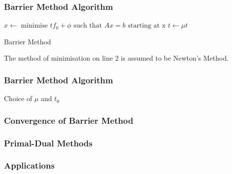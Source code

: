 \documentclass{beamer}
\begin{document}
\begin{frame}
    \frametitle{Barrier Method Algorithm}
    \begin{algorithm}[H]
        \begin{algorithmic}[1]
            \STATE $x \leftarrow \text{ minimise } tf_{0} + \phi
            \text{ such that } Ax = b \text{ starting at x}$
            \STATE $t \leftarrow \mu t$
            \ENDWHILE
        \end{algorithmic}
        \caption{Barrier Method}
        \label{alg:seq}
    \end{algorithm}
    The method of minimisation on line 2 is assumed to be Newton's Method.
\end{frame}

\begin{frame}
    \frametitle{Barrier Method Algorithm}
    Choice of $\mu$ and $t_{0}$
\end{frame}

\begin{frame}
    \frametitle{Convergence of Barrier Method}
\end{frame}

\begin{frame}
    \frametitle{Primal-Dual Methods}
\end{frame}


\begin{frame}
    \frametitle{Applications}
\end{frame}


\end{document}
